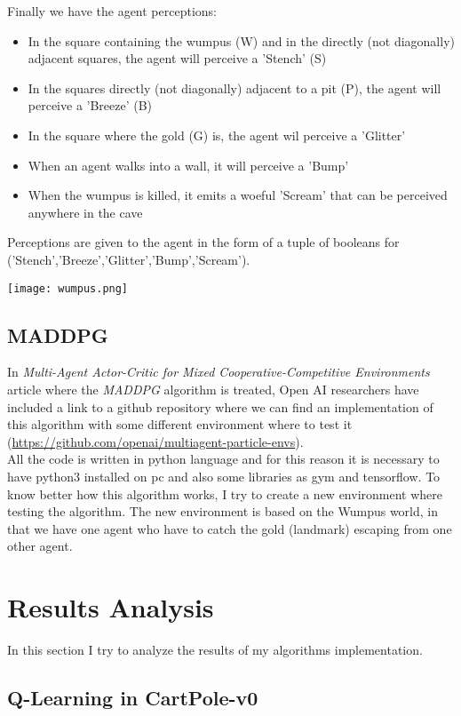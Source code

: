 \documentclass[]{report}
\begin{document}
\vspace{7 mm}
Finally we have the agent perceptions:
\vspace{5 mm}

\begin{itemize}
  \item In the square containing the wumpus (W) and in the directly (not diagonally) adjacent squares, the agent will perceive a 'Stench' (S)
  \item In the squares directly (not diagonally) adjacent to a pit (P), the agent will perceive a 'Breeze' (B)
  \item In the square where the gold (G) is, the agent wil perceive a 'Glitter'
  \item When an agent walks into a wall, it will perceive a 'Bump'
  \item When the wumpus is killed, it emits a woeful 'Scream' that can be perceived anywhere in the cave
\end{itemize}

Perceptions are given to the agent in the form of a tuple of booleans for
('Stench','Breeze','Glitter','Bump','Scream').

\vspace{10 mm}

\begin{center}
	\texttt{[image: wumpus.png]}
\end{center}
 
\vspace{30 mm}
\section{MADDPG}
In \emph{Multi-Agent Actor-Critic for Mixed Cooperative-Competitive Environments} article where the \emph{MADDPG} algorithm is treated, Open AI researchers have included a link to a github repository where we can find an implementation of this algorithm with some different environment where to test it (\url{https://github.com/openai/multiagent-particle-envs}).\\ 
All the code is written in python language and for this reason it is necessary to have python3 installed on pc and also some libraries as gym and tensorflow.
To know better how this algorithm works, I try to create a new environment where testing the algorithm.
The new environment is based on the Wumpus world, in that we have one agent who have to catch the gold (landmark) escaping from one other agent.


\chapter{Results Analysis}
In this section I try to analyze the results of my algorithms implementation.

\section{Q-Learning in CartPole-v0}
\end{document}
